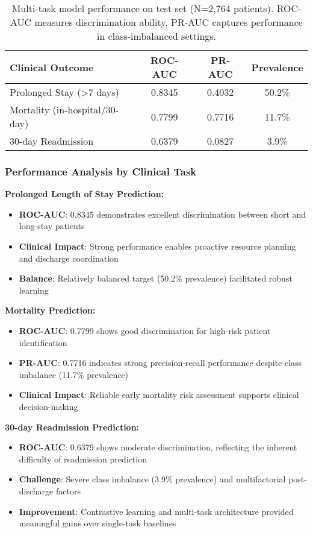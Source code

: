 \documentclass[11pt]{article}
\begin{document}
\begin{table}[h!]
\centering
\begin{tabular}{lccc}
\toprule
\textbf{Clinical Outcome} & \textbf{ROC-AUC} & \textbf{PR-AUC} & \textbf{Prevalence} \\
\midrule
Prolonged Stay (>7 days) & 0.8345 & 0.4032 & 50.2\% \\
Mortality (in-hospital/30-day) & 0.7799 & 0.7716 & 11.7\% \\
30-day Readmission & 0.6379 & 0.0827 & 3.9\% \\
\bottomrule
\end{tabular}
\caption{Multi-task model performance on test set (N=2,764 patients). ROC-AUC measures discrimination ability, PR-AUC captures performance in class-imbalanced settings.}
\label{tab:performance}
\end{table}

\subsubsection{Performance Analysis by Clinical Task}

\textbf{Prolonged Length of Stay Prediction:}
\begin{itemize}
    \item \textbf{ROC-AUC}: 0.8345 demonstrates excellent discrimination between short and long-stay patients
    \item \textbf{Clinical Impact}: Strong performance enables proactive resource planning and discharge coordination
    \item \textbf{Balance}: Relatively balanced target (50.2\% prevalence) facilitated robust learning
\end{itemize}

\textbf{Mortality Prediction:}
\begin{itemize}
    \item \textbf{ROC-AUC}: 0.7799 shows good discrimination for high-risk patient identification
    \item \textbf{PR-AUC}: 0.7716 indicates strong precision-recall performance despite class imbalance (11.7\% prevalence)
    \item \textbf{Clinical Impact}: Reliable early mortality risk assessment supports clinical decision-making
\end{itemize}

\textbf{30-day Readmission Prediction:}
\begin{itemize}
    \item \textbf{ROC-AUC}: 0.6379 shows moderate discrimination, reflecting the inherent difficulty of readmission prediction
    \item \textbf{Challenge}: Severe class imbalance (3.9\% prevalence) and multifactorial post-discharge factors
    \item \textbf{Improvement}: Contrastive learning and multi-task architecture provided meaningful gains over single-task baselines
\end{itemize}
\end{document}
